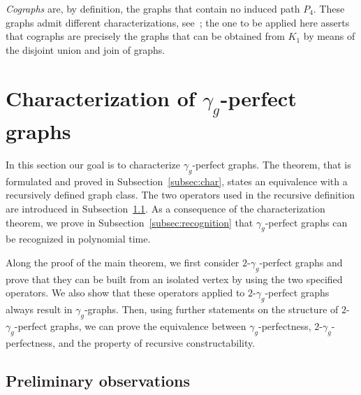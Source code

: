 \documentclass[12pt]{article}
\begin{document}
{\em Cographs} are, by definition, the graphs that contain no induced path $P_4$. These graphs admit different characterizations, see~\cite{corneil-1981};  the one to be applied here asserts that cographs are precisely the graphs that can be obtained from $K_1$ by means of the disjoint union and join of graphs. 

\section{Characterization of $\gamma_g$-perfect graphs}
\label{sec:gamma-g}

In this section our goal is to characterize $\gamma_g$-perfect graphs. 
The theorem, that is formulated and proved in Subsection~\ref{subsec:char}, states an equivalence with a recursively defined graph class. The two operators used in the recursive definition are introduced in Subsection~\ref{subsec:pre}. As a consequence of the characterization theorem, we prove in Subsection~\ref{subsec:recognition} that $\gamma_g$-perfect graphs can be recognized in polynomial time.

Along the proof of the main theorem, we first consider $2$-$\gamma_g$-perfect graphs and prove that they can be built from an isolated vertex by using the two specified operators. We also show that these operators applied to $2$-$\gamma_g$-perfect graphs always result in $\gamma_g$-graphs. Then, using further statements on the structure of $2$-$\gamma_g$-perfect graphs, we can prove the equivalence between $\gamma_g$-perfectness, $2$-$\gamma_g$-perfectness, and the property of recursive constructability.




\subsection{Preliminary observations}
\label{subsec:pre}
\end{document}
